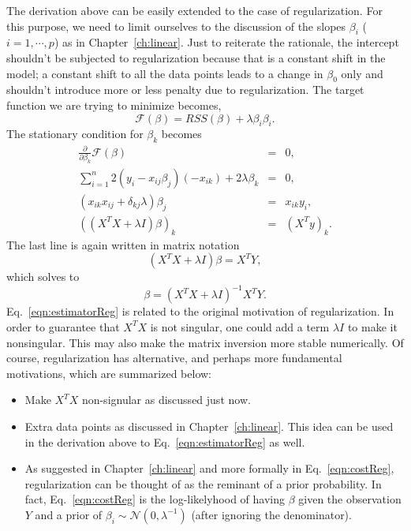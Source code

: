 The derivation above can be easily extended to the case of regularization. For this purpose, we need to limit ourselves to the discussion of the slopes $\beta_i$ ($i=1,\cdots,p$) as in Chapter~\ref{ch:linear}. Just to reiterate the rationale, the intercept shouldn't be subjected to regularization because that is a constant shift in the model; a constant shift to all the data points leads to a change in $\beta_0$ only and shouldn't introduce more or less penalty due to regularization. The target function we are trying to minimize becomes,
\begin{equation}
	\mathcal F(\beta)=RSS(\beta)+\lambda\beta_i\beta_i.\label{eqn:costReg}
\end{equation}
The stationary condition for $\beta_k$ becomes
\begin{eqnarray}
	\frac{\partial}{\partial\beta_k}\mathcal F(\beta) &=& 0, \\
	\sum_{i=1}^{n}2\left(y_i-x_{ij}\beta_j\right)(-x_{ik}) + 2\lambda\beta_k & = & 0,\\
	(x_{ik}x_{ij}+\delta_{kj}\lambda)\beta_j &=& x_{ik}y_i, \\
	((X^TX+\lambda I)\beta)_k &=& (X^Ty)_k.
\end{eqnarray} 
The last line is again written in matrix notation
\begin{equation}
	(X^TX+\lambda I)\beta = X^TY,
\end{equation}
which solves to
\begin{equation}
	\beta = (X^TX+\lambda I)^{-1}X^TY.\label{eqn:estimatorReg}
\end{equation}
Eq.~\ref{eqn:estimatorReg} is related to the original motivation of regularization. In order to guarantee that $X^TX$ is not singular, one could add a term $\lambda I$ to make it nonsingular. This may also make the matrix inversion more stable numerically. Of course, regularization has alternative, and perhaps more fundamental motivations, which are summarized below:
\begin{itemize}
	\item Make $X^TX$ non-signular as discussed just now.
	\item Extra data points as discussed in Chapter~\ref{ch:linear}. This idea can be used in the derivation above to Eq.~\ref{eqn:estimatorReg} as well.
	\item As suggested in Chapter~\ref{ch:linear} and more formally in Eq.~\ref{eqn:costReg}, regularization can be thought of as the reminant of a prior probability. In fact, Eq.~\ref{eqn:costReg} is the log-likelyhood of having $\beta$ given the observation $Y$ and a prior of $\beta_i\sim\mathcal N(0,\lambda^{-1})$ (after ignoring the denominator).
\end{itemize}
